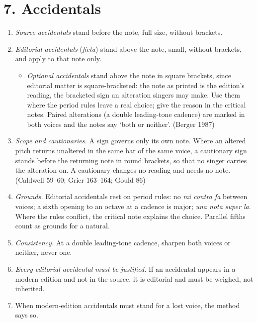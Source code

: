 \section*{7. Accidentals}

\begin{enumerate}

\tightlist
\item
  \textit{Source accidentals} stand before the note, full size, without brackets.
\item
  \textit{Editorial accidentals} (\emph{ficta}) stand above the note, small, without brackets, and apply to that note only.

  \begin{itemize}
  \tightlist
  \item
    \textit{Optional accidentals} stand above the note in square brackets, since editorial matter is square-bracketed: the note as printed is the edition's reading, the bracketed sign an alteration singers may make. Use them where the period rules leave a real choice; give the reason in the critical notes. Paired alterations (a double leading-tone cadence) are marked in both voices and the notes say ‘both or neither’. (Berger 1987)
  \end{itemize}
\item
  \textit{Scope and cautionaries.} A sign governs only its own note. Where an altered pitch returns unaltered in the same bar of the same voice, a cautionary sign stands before the returning note in round brackets, so that no singer carries the alteration on. A cautionary changes no reading and needs no note. (Caldwell 59--60; Grier 163--164; Gould 86)
\item
  \textit{Grounds.} Editorial accidentals rest on period rules: no \emph{mi contra fa} between voices; a sixth opening to an octave at a cadence is major; \emph{una nota super la}. Where the rules conflict, the critical note explains the choice. Parallel fifths count as grounds for a natural.
\item
  \textit{Consistency.} At a double leading-tone cadence, sharpen both voices or neither, never one.
\item
  \textit{Every editorial accidental must be justified.} If an accidental appears in a modern edition and not in the source, it is editorial and must be weighed, not inherited.
\item
  When modern-edition accidentals must stand for a lost voice, the method says so.
\end{enumerate}

